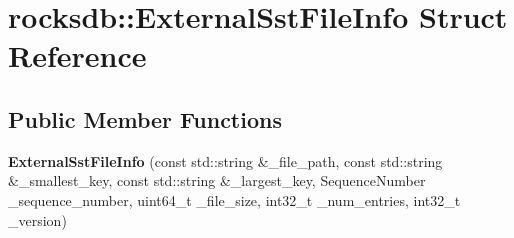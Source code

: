 \hypertarget{structrocksdb_1_1ExternalSstFileInfo}{}\section{rocksdb\+:\+:External\+Sst\+File\+Info Struct Reference}
\label{structrocksdb_1_1ExternalSstFileInfo}
\subsection*{Public Member Functions}
\begin{DoxyCompactItemize}
\item 
{\bfseries External\+Sst\+File\+Info} (const std\+::string \&\+\_\+file\+\_\+path, const std\+::string \&\+\_\+smallest\+\_\+key, const std\+::string \&\+\_\+largest\+\_\+key, Sequence\+Number \+\_\+sequence\+\_\+number, uint64\+\_\+t \+\_\+file\+\_\+size, int32\+\_\+t \+\_\+num\+\_\+entries, int32\+\_\+t \+\_\+version)\hypertarget{structrocksdb_1_1ExternalSstFileInfo_a7e63e1daef5c43b78284a1d0c2a72c5a}{}\label{structrocksdb_1_1ExternalSstFileInfo_a7e63e1daef5c43b78284a1d0c2a72c5a}

\end{DoxyCompactItemize}
